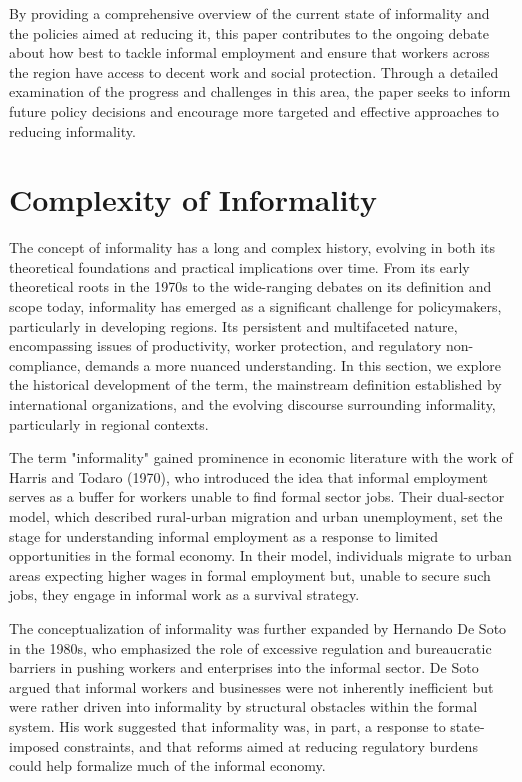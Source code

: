\documentclass[english]{article}
\begin{document}
By providing a comprehensive overview of the current state of informality and the policies aimed at reducing it, this paper contributes to the ongoing debate about how best to tackle informal employment and ensure that workers across the region have access to decent work and social protection. Through a detailed examination of the progress and challenges in this area, the paper seeks to inform future policy decisions and encourage more targeted and effective approaches to reducing informality.


\section{Complexity of Informality}

The concept of informality has a long and complex history, evolving in both its theoretical foundations and practical implications over time. From its early theoretical roots in the 1970s to the wide-ranging debates on its definition and scope today, informality has emerged as a significant challenge for policymakers, particularly in developing regions. Its persistent and multifaceted nature, encompassing issues of productivity, worker protection, and regulatory non-compliance, demands a more nuanced understanding. In this section, we explore the historical development of the term, the mainstream definition established by international organizations, and the evolving discourse surrounding informality, particularly in regional contexts.

The term "informality" gained prominence in economic literature with the work of Harris and Todaro (1970), who introduced the idea that informal employment serves as a buffer for workers unable to find formal sector jobs. Their dual-sector model, which described rural-urban migration and urban unemployment, set the stage for understanding informal employment as a response to limited opportunities in the formal economy. In their model, individuals migrate to urban areas expecting higher wages in formal employment but, unable to secure such jobs, they engage in informal work as a survival strategy.

The conceptualization of informality was further expanded by Hernando De Soto in the 1980s, who emphasized the role of excessive regulation and bureaucratic barriers in pushing workers and enterprises into the informal sector. De Soto argued that informal workers and businesses were not inherently inefficient but were rather driven into informality by structural obstacles within the formal system. His work suggested that informality was, in part, a response to state-imposed constraints, and that reforms aimed at reducing regulatory burdens could help formalize much of the informal economy.
\end{document}
